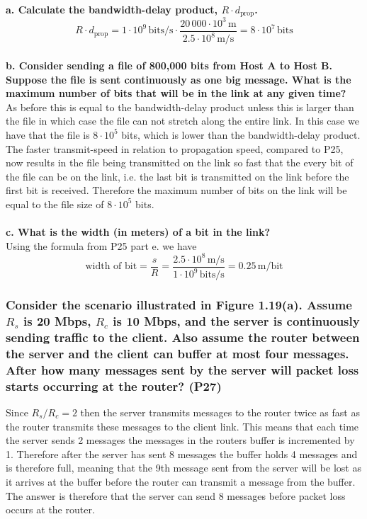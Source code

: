\textbf{a. Calculate the bandwidth-delay product, $R \cdot d_{\text{prop}}$.} \\
\begin{equation*}
    R \cdot d_\text{prop} = 1 \cdot 10^9 \, \text{bits/s} \cdot \frac{20 \, 000 \cdot 10^3 \, \text{m}}{2.5 \cdot 10^8 \, \text{m/s}} = 8 \cdot 10^7 \, \text{bits}
\end{equation*}
\\
\textbf{b. Consider sending a file of 800,000 bits from Host A to Host B. Suppose the file is sent continuously as one big message. What is the maximum number of bits that will be in the link at any given time?} \\
As before this is equal to the bandwidth-delay product unless this is larger than the file in which case the file can not stretch along the entire link. In this case we have that the file is $8 \cdot 10^5$ bits, which is lower than the bandwidth-delay product. The faster transmit-speed in relation to propagation speed, compared to P25, now results in the file being transmitted on the link so fast that the every bit of the file can be on the link, i.e. the last bit is transmitted on the link before the first bit is received. Therefore the maximum number of bits on the link will be equal to the file size of $8 \cdot 10^5$ bits. \\
\\
\textbf{c. What is the width (in meters) of a bit in the link?} \\
Using the formula from P25 part e. we have
\begin{equation*}
    \text{width of bit} = \frac{s}{R} = \frac{2.5 \cdot 10^8 \, \text{m/s}}{ 1 \cdot 10^9 \, \text{bits/s}} =  0.25 \, \text{m/bit}
\end{equation*}



\subsubsection{Consider the scenario illustrated in Figure 1.19(a). Assume $R_s$ is 20 Mbps, $R_c$ is 10 Mbps, and the server is continuously sending traffic to the client. Also assume the router between the server and the client can buffer at most four messages. After how many messages sent by the server will packet loss starts occurring at the router? (P27)}

Since $R_s/R_c = 2$ then the server transmits messages to the router twice as fast as the router transmits these messages to the client link. This means that each time the server sends 2 messages the messages in the routers buffer is incremented by 1. Therefore after the server has sent 8 messages the buffer holds 4 messages and is therefore full, meaning that the 9th message sent from the server will be lost as it arrives at the buffer before the router can transmit a message from the buffer. The answer is therefore that the server can send 8 messages before packet loss occurs at the router.



